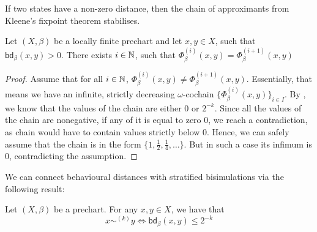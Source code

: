 If two states have a non-zero distance, then the chain of approximants from Kleene's fixpoint theorem stabilises.
\begin{lemma}\label{lem:chain_stabilises}
	Let $(X, \beta)$ be a locally finite prechart and let $x,y \in X$, such that $\mathsf{bd}_\beta(x,y)>0$. There exists $i \in \mathbb{N}$, such that $\Phi_\beta^{(i)}(x,y)=\Phi^{(i+1)}_\beta(x,y)$
\end{lemma}
\begin{proof}
	Assume that for all $i \in \mathbb{N}$, $\Phi_\beta^{(i)}(x,y)\neq\Phi^{(i+1)}_\beta(x,y)$. Essentially, that means we have an infinite, strictly decreasing $\omega$-cochain $\{\Phi^{(i)}_\beta(x,y)\}_{i \in I}$. By , we know that the values of the chain are either $0$ or $2^{-k}$. Since all the values of the chain are nonegative, if any of it is equal to zero $0$, we reach a contradiction, as chain would have to contain values strictly below $0$. Hence, we can safely assume that the chain is in the form $\{1,\frac{1}{2}, \frac{1}{4}, \dots\}$. But in such a case its infimum is $0$, contradicting the assumption.
\end{proof}
We can connect behavioural distances with stratified bisimulations via the following result:
\begin{lemma}\label{lem:bound_on_stratified_bisim}
	Let $(X, \beta)$ be a prechart. For any $x,y \in X$, we have that 
	$$
	x \sim^{(k)} y \iff \mathsf{bd}_{\beta}(x,y) \leq 2^{-k}
	$$
\end{lemma}
